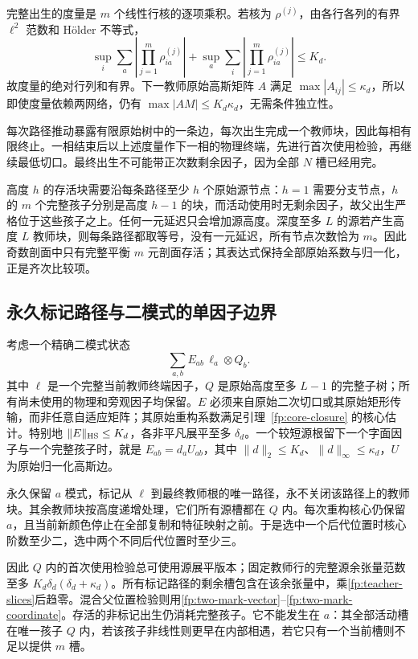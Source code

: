 \documentclass[a4paper]{tufte-handout}
\begin{document}
\begin{fullwidth}
完整出生的度量是 $m$ 个线性行核的逐项乘积。若核为 $\rho^{(j)}$，由各行各列的有界 $\ell^2$ 范数和 H\"older 不等式，
\begin{equation}\label{fp:metric-schur}
 \sup_i\sum_a\left|\prod_{j=1}^m\rho^{(j)}_{ia}\right|
 +\sup_a\sum_i\left|\prod_{j=1}^m\rho^{(j)}_{ia}\right|\le K_d.
\end{equation}
故度量的绝对行列和有界。下一教师原始高斯矩阵 $A$ 满足 $\max|A_{ij}|\le\kappa_d$，所以即使度量依赖两网络，仍有 $\max|AM|\le K_d\kappa_d$，无需条件独立性。

每次路径推动暴露有限原始树中的一条边，每次出生完成一个教师块，因此每相有限终止。一相结束后以上述度量作下一相的物理终端，先进行首次使用检验，再继续最低切口。最终出生不可能带正次数剩余因子，因为全部 $N$ 槽已经用完。

高度 $h$ 的存活块需要沿每条路径至少 $h$ 个原始源节点：$h=1$ 需要分支节点，$h$ 的 $m$ 个完整孩子分别是高度 $h-1$ 的块，而活动使用时无剩余因子，故父出生严格位于这些孩子之上。任何一元延迟只会增加源高度。深度至多 $L$ 的源若产生高度 $L$ 教师块，则每条路径都取等号，没有一元延迟，所有节点次数恰为 $m$。因此奇数剖面中只有完整平衡 $m$ 元剖面存活；其表达式保持全部原始系数与归一化，正是齐次比较项。

\subsection{永久标记路径与二模式的单因子边界}\label{fp:permanent-mark}
考虑一个精确二模式状态
\begin{equation}\label{fp:marked-state}
 \sum_{a,b}E_{ab}\,\ell_a\otimes Q_b.
\end{equation}
其中 $\ell$ 是一个完整当前教师终端因子，$Q$ 是原始高度至多 $L-1$ 的完整子树；所有尚未使用的物理和旁观因子均保留。$E$ 必须来自原始二次切口或其原始矩形传输，而非任意自适应矩阵；其原始重构系数满足引理~\ref{fp:core-closure} 的核心估计。特别地 $\|E\|_{\rm HS}\le K_d$，各非平凡展平至多 $\delta_d$。一个较短源根留下一个字面因子与一个完整孩子时，就是 $E_{ab}=d_aU_{ab}$，其中 $\|d\|_2\le K_d$、$\|d\|_\infty\le\kappa_d$，$U$ 为原始归一化高斯边。

永久保留 $a$ 模式，标记从 $\ell$ 到最终教师根的唯一路径，永不关闭该路径上的教师块。其余教师块按高度递增处理，它们所有源槽都在 $Q$ 内。每次重构核心仍保留 $a$，且当前新颜色停止在全部复制和特征映射之前。于是选中一个后代位置时核心阶数至少二，选中两个不同后代位置时至少三。

因此 $Q$ 内的首次使用检验总可使用源展平版本；固定教师行的完整源余张量范数至多 $K_d\delta_d(\delta_d+\kappa_d)$。所有标记路径的剩余槽包含在该余张量中，乘\eqref{fp:teacher-slices}后趋零。混合父位置检验则用\eqref{fp:two-mark-vector}--\eqref{fp:two-mark-coordinate}。存活的非标记出生仍消耗完整孩子。它不能发生在 $a$：其全部活动槽在唯一孩子 $Q$ 内，若该孩子非线性则更早在内部相遇，若它只有一个当前槽则不足以提供 $m$ 槽。


\end{fullwidth}
\end{document}

